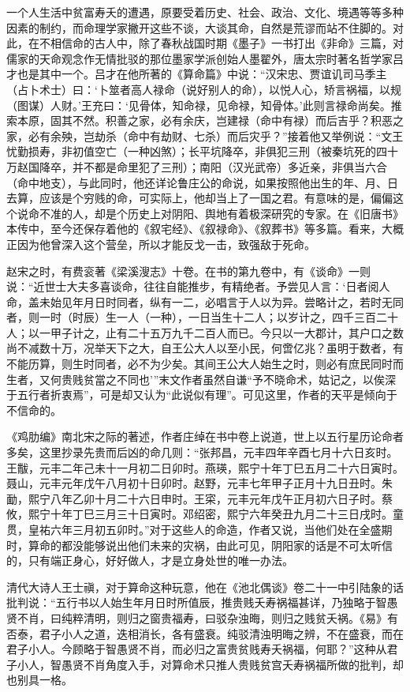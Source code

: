 \documentclass[a5paper,oneside,12pt]{ctexbook}
\begin{document}
{{一个人生活中贫富寿夭的遭遇，原要受着历史、社会、政治、文化、境遇等等多种因素的制约，而命理学家撇开这些不谈，大谈其命，自然是荒谬而站不住脚的。对此，在不相信命的古人中，除了春秋战国时期《墨子》一书打出《非命》三篇，对儒家的天命观念作无情批驳的那位墨家学派创始人墨翟外，唐太宗时著名哲学家吕才也是其中一个。吕才在他所著的《算命篇》中说：“汉宋忠、贾谊讥司马季主（占卜术士）曰：‘卜筮者高人禄命（说好别人的命），以悦人心，矫言祸福，以规（图谋）人财。’王充曰：‘见骨体，知命禄，见命禄，知骨体。’此则言禄命尚矣。推索本原，固其不然。积善之家，必有余庆，岂建禄（命中有禄）而后吉乎？积恶之家，必有余殃，岂劫杀（命中有劫财、七杀）而后灾乎？”接着他又举例说：“文王忧勤损寿，非初值空亡（一种凶煞）；长平坑降卒，非俱犯三刑（被秦坑死的四十万赵国降卒，并不都是命里犯了三刑）；南阳（汉光武帝）多近亲，非俱当六合（命中地支），与此同时，他还详论鲁庄公的命说，如果按照他出生的年、月、日去算，应该是个穷贱的命，可实际上，他却当上了一国之君。有意味的是，偏偏这个说命不准的人，却是个历史上对阴阳、舆地有着极深研究的专家。在《旧唐书》本传中，至今还保存着他的《叙宅经》、《叙禄命》、《叙葬书》等多篇。看来，大概正因为他曾深入这个营垒，所以才能反戈一击，致强敌于死命。

赵宋之时，有费衮著《梁溪溲志》十卷。在书的第九卷中，有《谈命》一则说：“近世士大夫多喜谈命，往往自能推步，有精绝者。予尝见人言：‘日者阅人命，盖未始见年月日时同者，纵有一二，必唱言于人以为异。尝略计之，若时无同者，则一时（时辰）生一人（一种），一日当生十二人；以岁计之，四千三百二十人；以一甲子计之，止有二十五万九千二百人而已。今只以一大郡计，其户口之数尚不减数十万，况举天下之大，自王公大人以至小民，何啻亿兆？虽明于数者，有不能历算，则生时同者，必不为少矣。其间王公大人始生之时，则必有庶民同时而生者，又何贵贱贫當之不同也’”末文作者虽然自谦“予不晓命术，姑记之，以俟深于五行者折衷焉”，可是却又认为“此说似有理”。可见这里，作者的天平是倾向于不信命的。

《鸡肋编》南北宋之际的著述，作者庄绰在书中卷上说道，世上以五行星历论命者多矣，这里抄录先贵而后凶的命几则：“张邦昌，元丰四年辛酉七月十六日亥时。王黻，元丰二年己未十一月初二日卯时。燕瑛，熙宁十年丁巳五月二十六日寅时。聂山，元丰元年戊午八月初十日卯时。赵野，元丰七年甲子正月十九日丑时。朱勔，熙宁八年乙卯十月二十六日申时。王寀，元丰元年戊午正月初六日子时。蔡攸，熙宁十年丁巳三月三十日寅时。邓绍密，熙宁六年癸丑九月二十三日戌时。童贯，皇祐六年三月初五卯时。”对于这些人的命造，作者又说，当他们处在全盛期时，算命的都没能够说出他们未来的灾祸，由此可见，阴阳家的话是不可太听信的，只有端正身心，好好做人，才是立身处世的唯一办法。

清代大诗人王士禛，对于算命这种玩意，他在《池北偶谈》卷二十一中引陆象的话批判说：“五行书以人始生年月日时所值辰，推贵贱夭寿祸福甚详，乃独略于智愚贤不肖，曰纯粹清明，则归之窗贵福寿，曰驳杂浊晦，则归之贱贫夭祸。《易》有否泰，君子小人之道，迭相消长，各有盛衰。纯驳清浊明晦之辨，不在盛衰，而在君子小人。今顾略于智愚贤不肖，而必归之富贵贫贱寿夭祸福，何耶？”这种从君子小人，智愚贤不肖角度入手，对算命术只推人贵贱贫宫夭寿祸福所做的批判，却也别具一格。

}}
\end{document}
